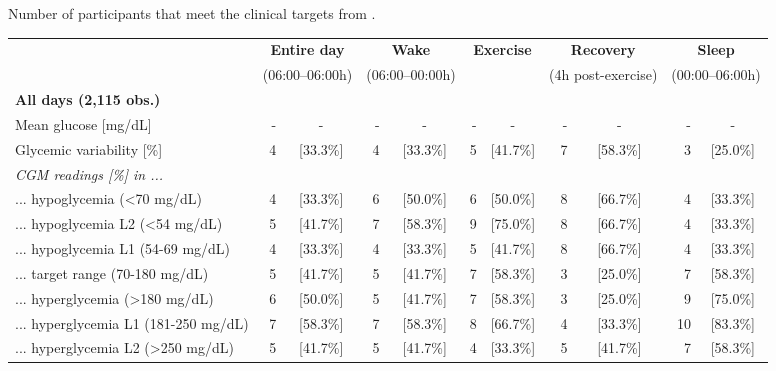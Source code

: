 \documentclass[11pt,a4paper]{article}
\begin{document}
\begin{threeparttable}
    \caption{Number of participants that meet the clinical targets from \citet{31177185}.}
    \label{tab:targets-number}
    \scriptsize
    \centering
    \begin{tabular}{@{}l rc rc rc rc rc@{}}
        \toprule
        & \multicolumn{2}{c}{\textbf{Entire day}} & \multicolumn{2}{c}{\textbf{Wake}} & \multicolumn{2}{c}{\textbf{Exercise}} & \multicolumn{2}{c}{\textbf{Recovery}} & \multicolumn{2}{c}{\textbf{Sleep}}\\
        & \multicolumn{2}{c}{(06:00--06:00h)} & \multicolumn{2}{c}{(06:00--00:00h)} & & & \multicolumn{2}{c}{(4h post-exercise)} & \multicolumn{2}{c}{(00:00--06:00h)}\\
        \midrule
        \textbf{All days (2,115 obs.)}\\
        Mean glucose [mg/dL] & - & - & - & - & - & - & - & - & - & -\\
        Glycemic variability [\%]                         & 4 & [33.3\%] & 4 & [33.3\%] & 5 & [41.7\%] & 7 & [58.3\%] & 3 & [25.0\%]\\
        \textit{CGM readings [\%] in ...} \\
        ... hypoglycemia (<70 mg/dL)                      & 4 & [33.3\%] & 6 & [50.0\%] & 6 & [50.0\%] & 8 & [66.7\%] & 4 & [33.3\%] \\
        \hspace{3mm} ... hypoglycemia L2 (<54 mg/dL)      & 5 & [41.7\%] & 7 & [58.3\%] & 9 & [75.0\%] & 8 & [66.7\%] & 4 & [33.3\%] \\
        \hspace{3mm} ... hypoglycemia L1 (54-69 mg/dL)    & 4 & [33.3\%] & 4 & [33.3\%] & 5 & [41.7\%] & 8 & [66.7\%] & 4 & [33.3\%]\\
        ... target range (70-180 mg/dL)                   & 5 & [41.7\%] & 5 & [41.7\%] & 7 & [58.3\%] & 3 & [25.0\%] & 7 & [58.3\%]\\
        ... hyperglycemia (>180 mg/dL)                    & 6 & [50.0\%] & 5 & [41.7\%] & 7 & [58.3\%] & 3 & [25.0\%] & 9 & [75.0\%]\\
        \hspace{3mm} ... hyperglycemia L1 (181-250 mg/dL) & 7 & [58.3\%] & 7 & [58.3\%] & 8 & [66.7\%] & 4 & [33.3\%] & 10 & [83.3\%]\\
        \hspace{3mm} ... hyperglycemia L2 (>250 mg/dL)    & 5 & [41.7\%] & 5 & [41.7\%] & 4 & [33.3\%] & 5 & [41.7\%] & 7 & [58.3\%]\\
        \midrule
    

\end{tabular}
\end{threeparttable}
\end{document}

